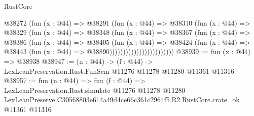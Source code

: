 \begin{lexlean}{RustCore}
\begin{coremodule}
                              @38272
                                (fun (x : @44) =>
                                @38291
                                  (fun (x : @44) =>
                                  @38310
                                    (fun (x : @44) =>
                                    @38329
                                      (fun (x : @44) =>
                                      @38348
                                        (fun (x : @44) =>
                                        @38367
                                          (fun (x : @44) =>
                                          @38386
                                            (fun (x : @44) =>
                                            @38405
                                              (fun (x : @44) =>
                                              @38424
                                                (fun (x : @44) =>
                                                @38443
                                                  (fun (x : @44) => @38890))))))))))))))))))))))))
@38939 := fun (x : @44) => @38938
@38947 := (n : @44) ->
  (f : @44) -> LexLeanPreservation.Rust.FunSem @11276 @11278 @11280 @11361 @11316
@38957 := fun (n : @44) =>
  fun (f : @44) =>
  LexLeanPreservation.Rust.simulate
    @11276
    @11278
    @11280
    LexLeanPreserve.C30568803e614a49d4ce66c361c2964f5.R2.RustCore.crate_ok
    @11361
    @11316
\end{coremodule}
\end{lexlean}
